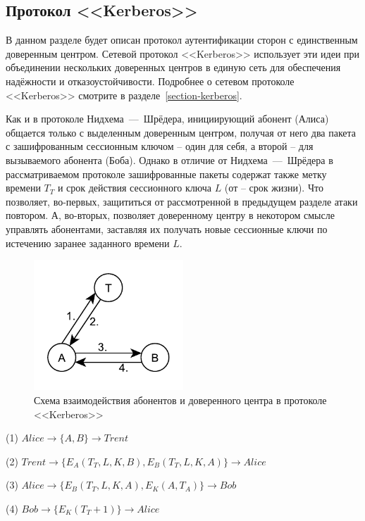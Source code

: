 \subsection{Протокол <<Kerberos>>}

В данном разделе будет описан протокол аутентификации сторон с единственным доверенным центром. Сетевой протокол <<Kerberos>> использует эти идеи при объединении нескольких доверенных центров в единую сеть для обеспечения надёжности и отказоустойчивости. Подробнее о сетевом протоколе <<Kerberos>> смотрите в разделе~\ref{section-kerberos}.

Как и в протоколе Нидхема~---~Шрёдера, инициирующий абонент (Алиса) общается только с выделенным доверенным центром, получая от него два пакета с зашифрованным сессионным ключом -- один для себя, а второй -- для вызываемого абонента (Боба). Однако в отличие от Нидхема~---~Шрёдера в рассматриваемом протоколе зашифрованные пакеты содержат также метку времени $T_T$ и срок действия сессионного ключа $L$ (от  -- срок жизни). Что позволяет, во-первых, защититься от рассмотренной в предыдущем разделе атаки повтором. А, во-вторых, позволяет доверенному центру в некотором смысле управлять абонентами, заставляя их получать новые сессионные ключи по истечению заранее заданного времени $L$.

\begin{figure}
    \centering
    \includegraphics[width=0.5\textwidth]{pic/key_distribution-kerberos}
    \caption{Схема взаимодействия абонентов и доверенного центра в протоколе <<Kerberos>>\label{fig:key_distribution-kerberos}}
\end{figure}

\begin{protocol}
	\item[(1)] $ Alice \to \{ A, B \} \to Trent $
	\item[(2)] $ Trent \to \{ E_A \left( T_T, L, K, B \right), E_B \left( T_T, L, K, A \right) \} \to Alice $
	\item[(3)] $ Alice \to \{ E_B \left( T_T, L, K, A \right), E_K \left( A, T_A \right) \} \to Bob $
	\item[(4)] $ Bob \to \{ E_K \left( T_T + 1 \right) \} \to Alice $
\end{protocol}

